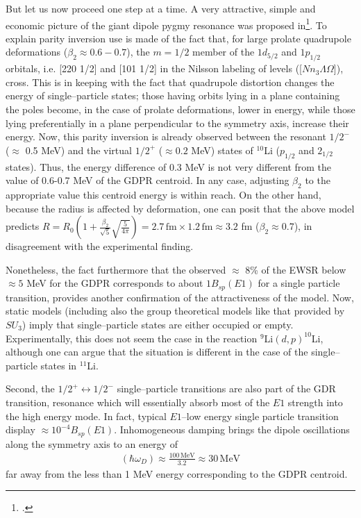 \begin{subappendices}
But let us now proceed one step at a time. A very attractive, simple and economic picture of the giant dipole pygmy resonance was proposed in\footnote{\cite{Hamamoto:07}.}. To explain parity inversion use is made of the fact that, for large prolate quadrupole deformations ($\beta_2\approx0.6-0.7$), the $m=1/2$ member of the $1d_{5/2}$ and $1p_{1/2}$ orbitals, i.e. [220 1/2] and [101 1/2] in the Nilsson labeling of levels ([$Nn_3\Lambda\Omega$]), cross. This is in keeping with the fact that quadrupole distortion changes the energy of single--particle states; those having orbits lying in a plane containing the poles become, in the case of prolate deformations, lower in energy, while those lying preferentially in a plane perpendicular to the symmetry axis, increase their energy. Now, this parity inversion is already observed between the resonant $1/2^-$ ($\approx$ 0.5 MeV) and the virtual $1/2^+$ ($\approx 0.2$ MeV) states of $^{10}$Li ($p_{1/2}$ and $2_{1/2}$ states). Thus, the energy difference of 0.3 MeV is not very different from the value of 0.6-0.7 MeV of the GDPR centroid. In any case, adjusting $\beta_2$ to the appropriate value this centroid energy is within reach. On the other hand, because the radius is  affected by deformation, one can posit that the above model predicts  $R=R_0(1+\frac{\beta_2}{\sqrt{5}}\sqrt{\frac{5}{4\pi}})=2.7\,\text{fm}\times 1.2\,\text{fm}\approx 3.2$ fm ($\beta_2\approx0.7$), in disagreement  with the experimental finding. 


Nonetheless, the fact furthermore that the observed $\approx$ 8\% of the EWSR below $\approx 5$ MeV for the GDPR corresponds to about $1B_{sp}(E1)$ for a single particle transition, provides another confirmation of the attractiveness of the model. Now, static models (including also the group theoretical models like that provided by $SU_3$) imply that single--particle states are either occupied or empty. Experimentally, this does not seem the case in the reaction $^9$Li$(d,p)^{10}$Li, although one can argue that the situation is different in the case of the single--particle states in $^{11}$Li.


Second, the $1/2^+ \longleftrightarrow1/2^-$ single--particle transitions are also  part of the GDR transition, resonance which will essentially absorb most of the $E1$ strength into the high energy mode. In fact, typical $E1$--low energy single particle transition display $\approx 10^{-4}B_{sp}(E1)$. Inhomogeneous damping  brings the dipole oscillations along the symmetry axis to an energy of
\begin{align}
(\hbar\omega_D)\approx\frac{100\,\text{MeV}}{3.2}\approx 30\,\text{MeV}
\end{align}
far away from the less than 1 MeV energy corresponding to the GDPR centroid.


\end{subappendices}
